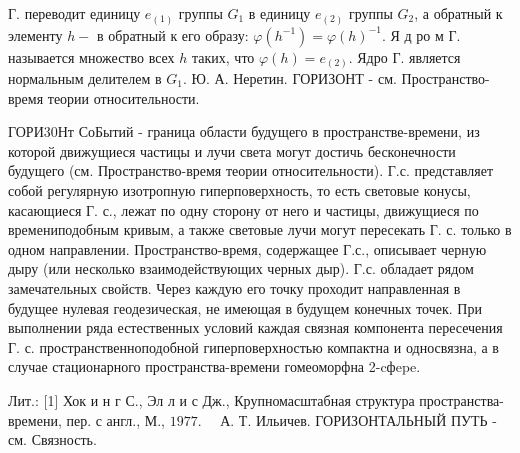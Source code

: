 \documentclass[10pt]{article}
\begin{document}
Г. переводит единицу $e_{(1)}$ группы $G_{1}$ в единицу $e_{(2)}$ группы $G_{2}$, а обратный к элементу $h-$ в обратный к его образу: $\varphi\left(h^{-1}\right)=\varphi(h)^{-1}$. Я д ро м Г. называется множество всех $h$ таких, что $\varphi(h)=e_{(2)}$. Ядро Г. является нормальным делителем в $G_{1}$. Ю. А. Неретин. ГОРИЗОНТ - см. Пространство-время теории относительности.



ГОРИ30Нт СоБытий - граница области будущего в пространстве-времени, из которой движущиеся частицы и лучи света могут достичь бесконечности будущего (см. Пространство-время теории относительности). Г.с. представляет собой регулярную изотропную гиперповерхность, то есть световые конусы, касающиеся Г. с., лежат по одну сторону от него и частицы, движущиеся по времениподобным кривым, а также световые лучи могут пересекать Г. с. только в одном направлении. Пространство-время, содержащее Г.с., описывает черную дыру (или несколько взаимодействующих черных дыр). Г.с. обладает рядом замечательных свойств. Через каждую его точку проходит направленная в будущее нулевая геодезическая, не имеющая в будущем конечных точек. При выполнении ряда естественных условий каждая связная компонента пересечения Г. с. пространственноподобной гиперповерхностью компактна и односвязна, а в случае стационарного пространства-времени гомеоморфна 2-cфepe.



Лит.: [1] Хок и н г С., Эл л и с Дж., Крупномасштабная структура пространства-времени, пер. с англ., М., $1977 . \quad$ А. Т. Ильичев. ГОРИЗОНТАЛЬНЫЙ ПУТЬ - см. Связность.
\end{document}
